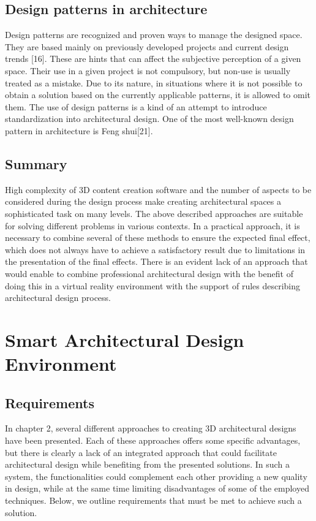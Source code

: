 \documentclass[runningheads]{llncs}
\begin{document}
\subsection{Design patterns in architecture}
Design patterns are recognized and proven ways to manage the designed space. They are based mainly on previously developed projects and current design trends [16]. These are hints that can affect the subjective perception of a given space. Their use in a given project is not compulsory, but non-use is usually treated as a mistake. Due to its nature, in situations where it is not possible to obtain a solution based on the currently applicable patterns, it is allowed to omit them. The use of design patterns is a kind of an attempt to introduce standardization into architectural design. One of the most well-known design pattern in architecture is Feng shui[21].

\subsection{Summary}
High complexity of 3D content creation software and the number of aspects to be considered during the design process make creating architectural spaces a sophisticated task on many levels. The above described approaches are suitable for solving different problems in various contexts. In a practical approach, it is necessary to combine several of these methods to ensure the expected final effect, which does not always have to achieve a satisfactory result due to limitations in the presentation of the final effects.
There is an evident lack of an approach that would enable to combine professional architectural design with the benefit of doing this in a virtual reality environment with the support of rules describing architectural design process.

\section{Smart Architectural Design Environment}

\subsection{Requirements}
In chapter 2, several different approaches to creating 3D architectural designs have been presented. Each of these approaches offers some specific advantages, but there is clearly a lack of an integrated approach that could facilitate architectural design while benefiting from the presented solutions. In such a system, the functionalities could complement each other providing a new quality in design, while at the same time limiting disadvantages of some of the employed techniques. Below, we outline requirements that must be met to achieve such a solution.
\end{document}
